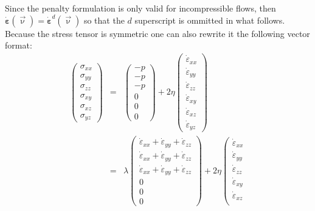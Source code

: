 Since the penalty formulation is only valid for incompressible flows, then 
$\dot{\bm \varepsilon}(\vec\upnu)=\dot{\bm \varepsilon}^d(\vec\upnu)$ so that 
the $d$ superscript is ommitted in what follows.
Because the stress tensor is symmetric one can also rewrite it the following vector format:
\begin{eqnarray}
\left(
\begin{array}{c}
\sigma_{xx}\\
\sigma_{yy}\\
\sigma_{zz}\\
\sigma_{xy}\\
\sigma_{xz}\\
\sigma_{yz}
\end{array}
\right)
&=&
\left(
\begin{array}{c}
-p\\
-p\\
-p\\
0\\
0\\
0
\end{array}
\right)
+2 \eta
\left(
\begin{array}{c}
\dot{\varepsilon}_{xx}\\
\dot{\varepsilon}_{yy}\\
\dot{\varepsilon}_{zz}\\
\dot{\varepsilon}_{xy}\\
\dot{\varepsilon}_{xz}\\
\dot{\varepsilon}_{yz}
\end{array}
\right)
\nonumber\\
&=&
\lambda
\left(
\begin{array}{c}
\dot{\varepsilon}_{xx} + \dot{\varepsilon}_{yy} + \dot{\varepsilon}_{zz}\\
\dot{\varepsilon}_{xx} + \dot{\varepsilon}_{yy} + \dot{\varepsilon}_{zz}\\
\dot{\varepsilon}_{xx} + \dot{\varepsilon}_{yy} + \dot{\varepsilon}_{zz}\\
0 \\ 0 \\ 0
\end{array}
\right)
+2 \eta
\left(
\begin{array}{c}
\dot{\varepsilon}_{xx}\\
\dot{\varepsilon}_{yy}\\
\dot{\varepsilon}_{zz}\\
\dot{\varepsilon}_{xy}\\
\dot{\varepsilon}_{xz}\\

\end{array}
\end{eqnarray}
